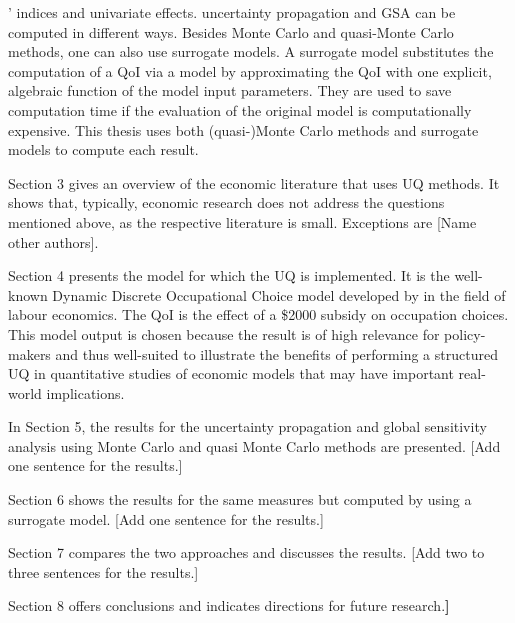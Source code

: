 ' indices and univariate effects. uncertainty propagation and GSA can be computed in different ways. Besides Monte Carlo and quasi-Monte Carlo methods, one can also use surrogate models. A surrogate model substitutes the computation of a QoI via a model by approximating the QoI with one explicit, algebraic function of the model input parameters. They are used to save computation time if the evaluation of the original model is computationally expensive. This thesis uses both (quasi-)Monte Carlo methods and surrogate models to compute each result.

Section 3 gives an overview of the economic literature that uses UQ methods. It shows that, typically, economic research does not address the questions mentioned above, as the respective literature is small. Exceptions are \cite{Harenberg.2019} [Name other authors].

Section 4 presents the model for which the UQ is implemented. It is the well-known Dynamic Discrete Occupational Choice model developed by \cite{Keane.1994} in the field of labour economics. The QoI is the effect of a \$2000 subsidy on occupation choices. This model output is chosen because the result is of high relevance for policy-makers and thus well-suited to illustrate the benefits of performing a structured UQ in quantitative studies of economic models that may have important real-world implications. 

In Section 5, the results for the uncertainty propagation and global sensitivity analysis using Monte Carlo and quasi Monte Carlo methods are presented. [Add one sentence for the results.]

Section 6 shows the results for the same measures but computed by using a surrogate model. [Add one sentence for the results.]

Section 7 compares the two approaches and discusses the results. [Add two to three sentences for the results.]

Section 8 offers conclusions and indicates directions for future research.\textsc{\LARGE \bf ]}









